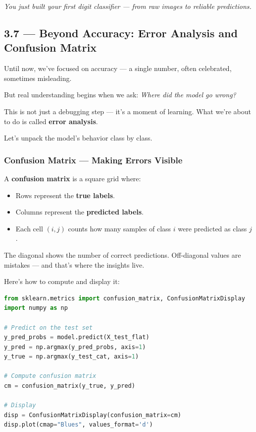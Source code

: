 \documentclass[11pt]{article}
\begin{document}
\bigskip

\begin{center}
\textit{You just built your first digit classifier — from raw images to reliable predictions.}
\end{center}


\subsection*{3.7 — Beyond Accuracy: Error Analysis and Confusion Matrix}

Until now, we’ve focused on accuracy — a single number, often celebrated, sometimes misleading.

But real understanding begins when we ask: \textit{Where did the model go wrong?}

This is not just a debugging step — it’s a moment of learning. What we’re about to do is called \textbf{error analysis}.

\vspace{0.5em}
\noindent
Let’s unpack the model’s behavior class by class.

\subsubsection*{Confusion Matrix — Making Errors Visible}

A \textbf{confusion matrix} is a square grid where:

\begin{itemize}
  \item Rows represent the \textbf{true labels}.
  \item Columns represent the \textbf{predicted labels}.
  \item Each cell \((i, j)\) counts how many samples of class \(i\) were predicted as class \(j\).
\end{itemize}

The diagonal shows the number of correct predictions.  
Off-diagonal values are mistakes — and that’s where the insights live.

\medskip
Here’s how to compute and display it:

\begin{lstlisting}[language=Python]
from sklearn.metrics import confusion_matrix, ConfusionMatrixDisplay
import numpy as np

# Predict on the test set
y_pred_probs = model.predict(X_test_flat)
y_pred = np.argmax(y_pred_probs, axis=1)
y_true = np.argmax(y_test_cat, axis=1)

# Compute confusion matrix
cm = confusion_matrix(y_true, y_pred)

# Display
disp = ConfusionMatrixDisplay(confusion_matrix=cm)
disp.plot(cmap="Blues", values_format='d')
\end{lstlisting}
\end{document}
